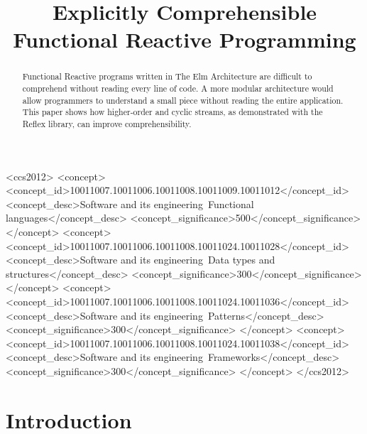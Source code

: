 \documentclass[sigconf]{acmart}
\begin{document}
\title{Explicitly Comprehensible Functional Reactive Programming}



\begin{abstract}
Functional Reactive programs written in The Elm Architecture are difficult to comprehend without reading every line of code. A more modular architecture would allow programmers to understand a small piece without reading the entire application. This paper shows how higher-order and cyclic streams, as demonstrated with the Reflex library, can improve comprehensibility.\end{abstract}

\begin{CCSXML}
<ccs2012>
<concept>
<concept_id>10011007.10011006.10011008.10011009.10011012</concept_id>
<concept_desc>Software and its engineering~Functional languages</concept_desc>
<concept_significance>500</concept_significance>
</concept>
<concept>
<concept_id>10011007.10011006.10011008.10011024.10011028</concept_id>
<concept_desc>Software and its engineering~Data types and structures</concept_desc>
<concept_significance>300</concept_significance>
</concept>
<concept>
<concept_id>10011007.10011006.10011008.10011024.10011036</concept_id>
<concept_desc>Software and its engineering~Patterns</concept_desc>
<concept_significance>300</concept_significance>
</concept>
<concept>
<concept_id>10011007.10011006.10011008.10011024.10011038</concept_id>
<concept_desc>Software and its engineering~Frameworks</concept_desc>
<concept_significance>300</concept_significance>
</concept>
</ccs2012>
\end{CCSXML}



\maketitle

\section{Introduction}
\end{document}
